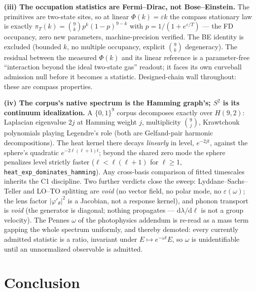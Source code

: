 \documentclass[11pt,a4paper]{article}
\theoremstyle{plain}
\theoremstyle{remark}
\begin{document}
\textbf{(iii) The occupation statistics are Fermi--Dirac, not Bose--Einstein.} The primitives are two-state sites, so at linear $\Phi(k) = \varepsilon k$ the compass stationary law is exactly $\pi_T(k) = \binom{9}{k} p^k (1-p)^{9-k}$ with $p = 1/(1+e^{\varepsilon/T})$ --- the FD occupancy, zero new parameters, machine-precision verified. The BE identity is excluded (bounded $k$, no multiple occupancy, explicit $\binom{9}{k}$ degeneracy). The residual between the measured $\Phi(k)$ and its linear reference is a parameter-free ``interaction beyond the ideal two-state gas'' readout; it faces its own curveball admission null before it becomes a statistic. Designed-chain wall throughout: these are compass properties.

\textbf{(iv) The corpus's native spectrum is the Hamming graph's; $S^2$ is its continuum idealization.} A $\{0,1\}^9$ corpus decomposes exactly over $H(9,2)$: Laplacian eigenvalue $2j$ at Hamming weight $j$, multiplicity $\binom{9}{j}$, Krawtchouk polynomials playing Legendre's role (both are Gelfand-pair harmonic decompositions). The heat kernel there decays \emph{linearly} in level, $e^{-2jt}$, against the sphere's quadratic $e^{-2\ell(\ell+1)t}$; beyond the shared zero mode the sphere penalizes level strictly faster ($\ell < \ell(\ell+1)$ for $\ell \ge 1$, \texttt{heat\_exp\_dominates\_hamming}). Any cross-basis comparison of fitted timescales inherits the C1 discipline. Two further verdicts close the sweep: Lyddane--Sachs--Teller and LO--TO splitting are \emph{void} (no vector field, no polar mode, no $\varepsilon(\omega)$; the lens factor $|\varphi'_\theta|^2$ is a Jacobian, not a response kernel), and phonon transport is \emph{void} (the generator is diagonal; nothing propagates --- $\mathrm{d}\lambda/\mathrm{d}\ell$ is not a group velocity). The Pennes $\omega$ of the photophysics addendum is re-read as a mass term gapping the whole spectrum uniformly, and thereby demoted: every currently admitted statistic is a ratio, invariant under $E \mapsto e^{-\omega t}E$, so $\omega$ is unidentifiable until an unnormalized observable is admitted.

\section{Conclusion}
\label{sec:conclusion}
\end{document}
